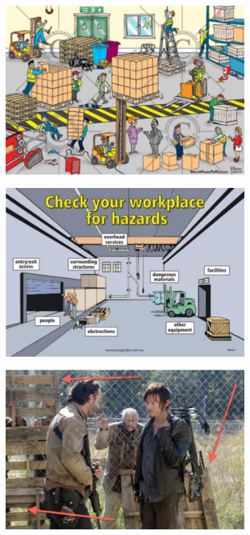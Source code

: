 \documentclass[aspectratio=1610,pdftex,dvipsnames,compress,xcolor={dvipsnames}]{beamer}
\begin{document}
\begin{frame}{}
    \begin{figure}
        \centering
        \includegraphics[width=0.80\textwidth]{warehouse.jpg}
    \end{figure}
\end{frame}


\begin{frame}{}
    \begin{figure}
        \centering
        \includegraphics[width=0.80\textwidth]{loading.dock.jpg}
    \end{figure}
\end{frame}


\begin{frame}{}
    \begin{figure}
        \centering
        \includegraphics[width=0.80\textwidth]{the.walking.dead.jpg}
    \end{figure}
\end{frame}
\end{document}
